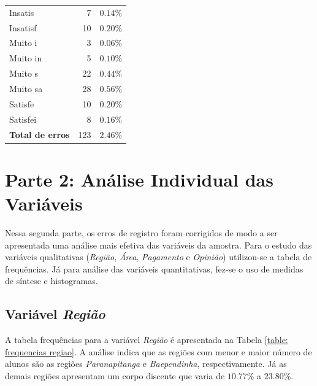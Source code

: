 \documentclass[10pt,a4paper,oneside]{article}
\newcommand{\baep}{Baependinha\xspace}
\newcommand{\para}{Paranapitanga\xspace}
\begin{document}
\begin{table}[!h]
\begin{minipage}[t]{0.49\textwidth}
\begin{tabular}{l r r}
	Insatis    & 7   & $0.14\%$ \\
	Insatisf   & 10  & $0.20\%$ \\
	Muito i    & 3   & $0.06\%$ \\
	Muito in   & 5   & $0.10\%$ \\
	Muito s    & 22  & $0.44\%$ \\
	Muito sa   & 28  & $0.56\%$ \\
	Satisfe    & 10  & $0.20\%$ \\
	Satisfei   & 8   & $0.16\%$ \\	
	\midrule
	\textbf{Total de erros}  & 123  & $2.46\%$ \\	
	\bottomrule
\end{tabular}
\end{minipage}
\end{table}


\begin{table}[!h]
\centering

\end{table}

\FloatBarrier

\clearpage
\section*{Parte 2: Análise Individual das Variáveis}

Nessa segunda parte, os erros de registro foram corrigidos de modo a ser apresentada uma análise mais efetiva das variáveis da amostra. Para o estudo das variáveis qualitativas (\textit{Região}, \textit{Área}, \textit{Pagamento} e \textit{Opinião}) utilizou-se a tabela de frequências. Já para análise das variáveis quantitativas, fez-se o uso de medidas de síntese e histogramas.

\subsection*{Variável \textit{Região}}

A tabela frequências para a variável \textit{Região} é apresentada na Tabela \ref{table: frequencias regiao}. A análise indica que as regiões com menor e maior número de alunos são as regiões \textit{\para} e \textit{\baep}, respectivamente. Já as demais regiões apresentam um corpo discente que varia de $10.77\%$ a $23.80\%$.
\end{document}
